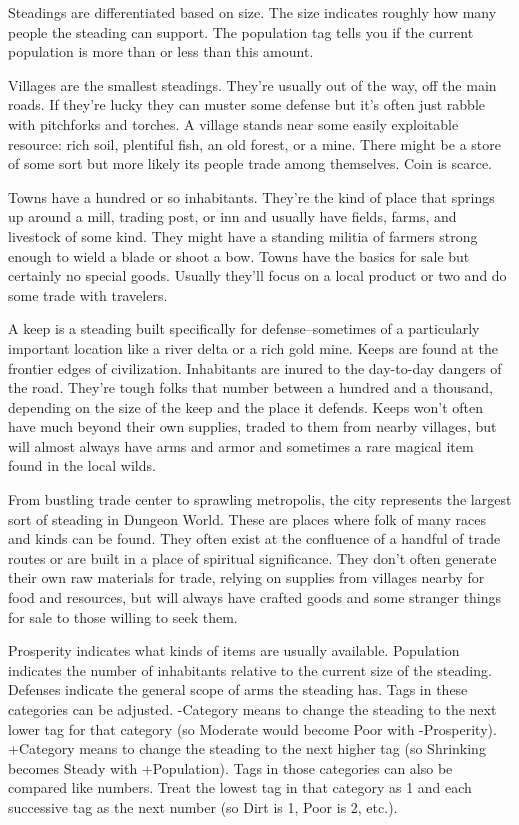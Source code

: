 Steadings are differentiated based on size. The size indicates roughly how many people the steading can support. The population tag tells you if the current population is more than or less than this amount.


Villages are the smallest steadings. They're usually out of the way, off the main roads. If they're lucky they can muster some defense but it's often just rabble with pitchforks and torches. A village stands near some easily exploitable resource: rich soil, plentiful fish, an old forest, or a mine. There might be a store of some sort but more likely its people trade among themselves. Coin is scarce.


Towns have a hundred or so inhabitants. They're the kind of place that springs up around a mill, trading post, or inn and usually have fields, farms, and livestock of some kind. They might have a standing militia of farmers strong enough to wield a blade or shoot a bow. Towns have the basics for sale but certainly no special goods. Usually they'll focus on a local product or two and do some trade with travelers.


A keep is a steading built specifically for defense--sometimes of a particularly important location like a river delta or a rich gold mine. Keeps are found at the frontier edges of civilization. Inhabitants are inured to the day-to-day dangers of the road. They're tough folks that number between a hundred and a thousand, depending on the size of the keep and the place it defends. Keeps won't often have much beyond their own supplies, traded to them from nearby villages, but will almost always have arms and armor and sometimes a rare magical item found in the local wilds.


From bustling trade center to sprawling metropolis, the city represents the largest sort of steading in Dungeon World. These are places where folk of many races and kinds can be found. They often exist at the confluence of a handful of trade routes or are built in a place of spiritual significance. They don't often generate their own raw materials for trade, relying on supplies from villages nearby for food and resources, but will always have crafted goods and some stranger things for sale to those willing to seek them.


Prosperity indicates what kinds of items are usually available. Population indicates the number of inhabitants relative to the current size of the steading. Defenses indicate the general scope of arms the steading has. Tags in these categories can be adjusted. -Category means to change the steading to the next lower tag for that category (so Moderate would become Poor with -Prosperity). +Category means to change the steading to the next higher tag (so Shrinking becomes Steady with +Population). Tags in those categories can also be compared like numbers. Treat the lowest tag in that category as 1 and each successive tag as the next number (so Dirt is 1, Poor is 2, etc.).


